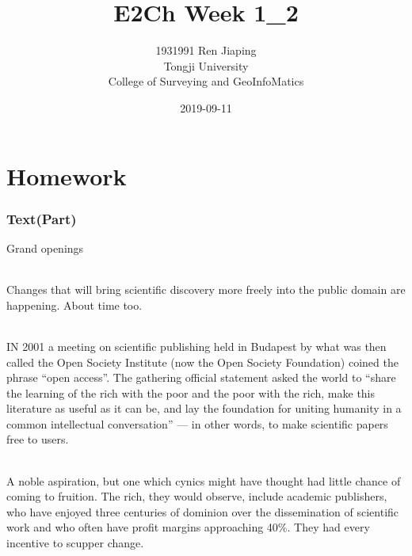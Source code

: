 \documentclass[a4paper, 12pt, UTF8]{article}
\begin{document}
\title{\Huge E2Ch Week 1\_2}
\author{\Large 
        1931991 Ren Jiaping \\[12pt]
        Tongji University \\[12pt]
        College of Surveying and GeoInfoMatics}
\date{2019-09-11}
\maketitle

\thispagestyle{empty}

\newpage
{}
\tableofcontents
{}

\newpage
{}
\part{Homework}

\newpage
\section{Text(Part)}

\begin{bfseries}
    \Large
    Grand openings
    \paragraph*{}
    \large
    Changes that will bring scientific discovery more freely into the public domain are happening. About time too.
\end{bfseries}

\paragraph*{}
    IN 2001 a meeting on scientific publishing held in Budapest by what was then called the Open Society Institute (now the Open Society Foundation) coined the phrase “open access”. The gathering official statement asked the world to “share the learning of the rich with the poor and the poor with the rich, make this literature as useful as it can be, and lay the foundation for uniting humanity in a common intellectual conversation” --- in other words, to make scientific papers free to users.

\paragraph*{}
    A noble aspiration, but one which cynics might have thought had little chance of coming to fruition. The rich, they would observe, include academic publishers, who have enjoyed three centuries of dominion over the dissemination of scientific work and who often have profit margins approaching 40\%. They had every incentive to scupper change.
\end{document}
